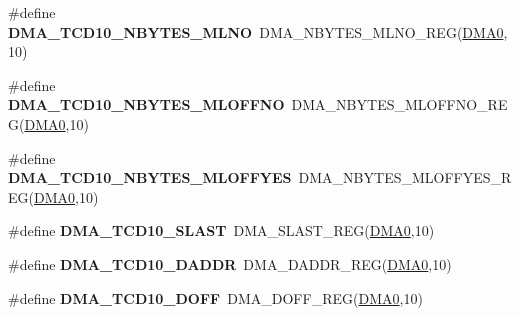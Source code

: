 \begin{DoxyCompactItemize}
\item 
\#define {\bfseries D\+M\+A\+\_\+\+T\+C\+D10\+\_\+\+N\+B\+Y\+T\+E\+S\+\_\+\+M\+L\+NO}~D\+M\+A\+\_\+\+N\+B\+Y\+T\+E\+S\+\_\+\+M\+L\+N\+O\+\_\+\+R\+EG(\hyperlink{group__DMA__Peripheral__Access__Layer_ga4103044f9ca209772f513dc694513ffb}{D\+M\+A0},10)\hypertarget{group__DMA__Register__Accessor__Macros_ga4485cacfcff76d14742c66de54736970}{}\label{group__DMA__Register__Accessor__Macros_ga4485cacfcff76d14742c66de54736970}

\item 
\#define {\bfseries D\+M\+A\+\_\+\+T\+C\+D10\+\_\+\+N\+B\+Y\+T\+E\+S\+\_\+\+M\+L\+O\+F\+F\+NO}~D\+M\+A\+\_\+\+N\+B\+Y\+T\+E\+S\+\_\+\+M\+L\+O\+F\+F\+N\+O\+\_\+\+R\+EG(\hyperlink{group__DMA__Peripheral__Access__Layer_ga4103044f9ca209772f513dc694513ffb}{D\+M\+A0},10)\hypertarget{group__DMA__Register__Accessor__Macros_ga4d9e594844e687369d3029dc568e2892}{}\label{group__DMA__Register__Accessor__Macros_ga4d9e594844e687369d3029dc568e2892}

\item 
\#define {\bfseries D\+M\+A\+\_\+\+T\+C\+D10\+\_\+\+N\+B\+Y\+T\+E\+S\+\_\+\+M\+L\+O\+F\+F\+Y\+ES}~D\+M\+A\+\_\+\+N\+B\+Y\+T\+E\+S\+\_\+\+M\+L\+O\+F\+F\+Y\+E\+S\+\_\+\+R\+EG(\hyperlink{group__DMA__Peripheral__Access__Layer_ga4103044f9ca209772f513dc694513ffb}{D\+M\+A0},10)\hypertarget{group__DMA__Register__Accessor__Macros_ga90f9361236c52b090f87c26ef140b940}{}\label{group__DMA__Register__Accessor__Macros_ga90f9361236c52b090f87c26ef140b940}

\item 
\#define {\bfseries D\+M\+A\+\_\+\+T\+C\+D10\+\_\+\+S\+L\+A\+ST}~D\+M\+A\+\_\+\+S\+L\+A\+S\+T\+\_\+\+R\+EG(\hyperlink{group__DMA__Peripheral__Access__Layer_ga4103044f9ca209772f513dc694513ffb}{D\+M\+A0},10)\hypertarget{group__DMA__Register__Accessor__Macros_ga8cb4717fe169f84271e8975cc5903950}{}\label{group__DMA__Register__Accessor__Macros_ga8cb4717fe169f84271e8975cc5903950}

\item 
\#define {\bfseries D\+M\+A\+\_\+\+T\+C\+D10\+\_\+\+D\+A\+D\+DR}~D\+M\+A\+\_\+\+D\+A\+D\+D\+R\+\_\+\+R\+EG(\hyperlink{group__DMA__Peripheral__Access__Layer_ga4103044f9ca209772f513dc694513ffb}{D\+M\+A0},10)\hypertarget{group__DMA__Register__Accessor__Macros_ga659dd82f494760eb11d0dcb7abe58624}{}\label{group__DMA__Register__Accessor__Macros_ga659dd82f494760eb11d0dcb7abe58624}

\item 
\#define {\bfseries D\+M\+A\+\_\+\+T\+C\+D10\+\_\+\+D\+O\+FF}~D\+M\+A\+\_\+\+D\+O\+F\+F\+\_\+\+R\+EG(\hyperlink{group__DMA__Peripheral__Access__Layer_ga4103044f9ca209772f513dc694513ffb}{D\+M\+A0},10)\hypertarget{group__DMA__Register__Accessor__Macros_gad4889efa76dd652b839b05370678f1c9}{}\label{group__DMA__Register__Accessor__Macros_gad4889efa76dd652b839b05370678f1c9}


\end{DoxyCompactItemize}
